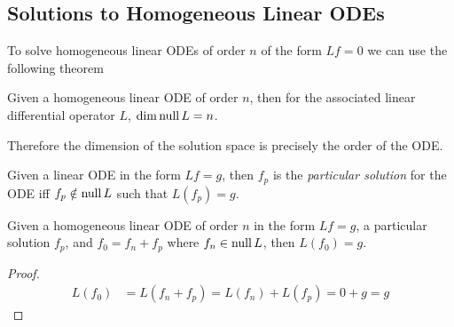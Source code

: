 \documentclass[notes]{subfiles}
\begin{document}
\subsection{Solutions to Homogeneous Linear ODEs}
To solve homogeneous linear ODEs of order $n$ of the form $Lf = 0$ we can use the following theorem
\begin{theorem}
    Given a homogeneous linear ODE of order $n$, then for the associated linear differential operator $L$, $\dim \operatorname{null} L = n$.
\end{theorem}
Therefore the dimension of the solution space is precisely the order of the ODE.

\begin{definition}
    Given a linear ODE in the form $Lf = g$, then $f_p$ is the \textit{particular solution} for the ODE iff $f_p \notin \operatorname{null} L$ such that $L(f_p) = g$.
\end{definition}


\begin{lemma}
    Given a homogeneous linear ODE of order $n$ in the form $Lf = g$, a particular solution $f_p$, and $f_0 = f_n + f_p$ where $f_n \in \operatorname{null} L$, then $L(f_0) = g$.
\end{lemma}
\begin{proof}
    \begin{align*}
        L(f_0)
        &= L(f_n + f_p)
        = L(f_n) + L(f_p)
        = 0 + g
        = g
    \end{align*}
\end{proof}
\end{document}
